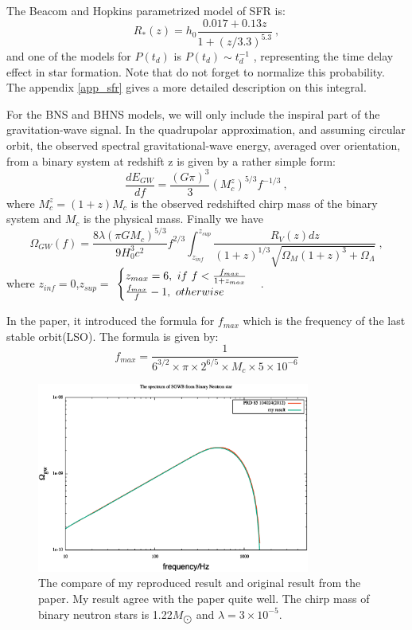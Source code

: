 \documentclass[11pt, a4paper]{article}
\begin{document}
The Beacom and Hopkins parametrized model of SFR\cite{Hopkins2006} is:
\begin{equation}
R_*(z)=h_0\frac{0.017+0.13z}{1+(z/3.3)^{5.3}}~,
\end{equation}
and one of the models for $P(t_d)$ is  $P(t_d)\sim t_d^{-1}$ , representing the time delay effect in star formation. Note that do not forget to normalize this probability. The appendix \ref{app_sfr} gives a more detailed description on this integral. 


For the BNS and BHNS models, we will only include the inspiral part of the gravitation-wave signal. In the quadrupolar approximation, and assuming circular orbit, the observed spectral gravitational-wave energy, averaged over orientation, from a binary system at redshift z is given by a rather simple form:
\begin{equation}
\frac{dE_{GW}}{df}=\frac{(G\pi)^3}{3}(M_c^z)^{5/3}f^{-1/3}~,
\end{equation}
where $M_c^z=(1+z)M_c$ is the observed redshifted chirp mass of the binary system and $M_c$ is the physical mass. Finally we have
\begin{equation}
\Omega_{GW}(f)=\frac{8\lambda (\pi GM_c)^{5/3}}{9H_0^3 c^2}f^{2/3}\int ^{z_{sup}}_{z_{inf}}\frac{R_V(z)dz}{(1+z)^{1/3}{\sqrt {\Omega_M(1+z)^3+\Omega_\Lambda}}}~,\label{spec}
\end{equation}
where $z_{inf}=0$,$z_{sup}=$
$
\centering
\begin{cases}
z_{max}=6,~ if~ f<\frac {f_{max}}{1+z_{max}} \\
\frac {f_{max}}{f}-1,~otherwise
\end{cases}
$. 

In the paper\cite{Sathyaprakash2001}, it introduced the formula for $f_{max}$ which is the frequency of the last stable orbit(LSO). The formula is given by:
\begin{equation}
f_{max}=\frac{1}{6^{3/2}\times\pi\times2^{6/5} \times M_c \times  5\times10^{-6}}
\end{equation}

\begin{figure}[htbp]
  \centering
  \includegraphics[width=0.8\textwidth]{fig1.eps}
  \caption{The compare of my reproduced result and original result from the paper\cite{Wu2012}. My result agree with the paper quite well. The chirp mass of binary neutron stars is 1.22$M_{\bigodot}$ and $\lambda=3\times 10^{-5}$.}\label{fig:BNS} 
\end{figure}
\end{document}
